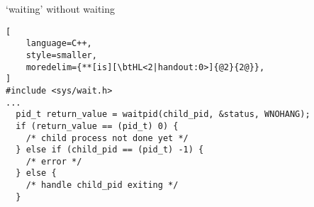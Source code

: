 

\begin{frame}[fragile,label=waitNoHang]{`waiting' without waiting}
\begin{lstlisting}[
    language=C++,
    style=smaller,
    moredelim={**[is][\btHL<2|handout:0>]{@2}{2@}},
]
#include <sys/wait.h>
...
  pid_t return_value = waitpid(child_pid, &status, WNOHANG);
  if (return_value == (pid_t) 0) {
    /* child process not done yet */
  } else if (child_pid == (pid_t) -1) {
    /* error */
  } else {
    /* handle child_pid exiting */
  }
\end{lstlisting}
\end{frame}
